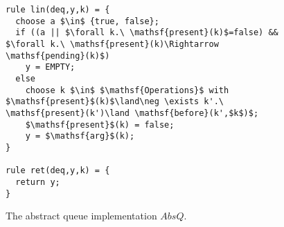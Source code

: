 \begin{figure}[t]
\begin{minipage}[t]{5cm}
\begin{lstlisting}
rule lin(deq,y,k) = {
  choose a $\in$ {true, false};
  if ((a || $\forall k.\ \mathsf{present}(k)$=false) && $\forall k.\ \mathsf{present}(k)\Rightarrow \mathsf{pending}(k)$) 
    y = EMPTY;
  else 
    choose k $\in$ $\mathsf{Operations}$ with $\mathsf{present}$(k)$\land\neg \exists k'.\ \mathsf{present}(k')\land \mathsf{before}(k',$k$)$;
    $\mathsf{present}$(k) = false;
    y = $\mathsf{arg}$(k);
}

rule ret(deq,y,k) = {
  return y;
}
\end{lstlisting}
\end{minipage}



	\caption{The abstract queue implementation $AbsQ$.}
	\label{fig:signatures}
\end{figure}
